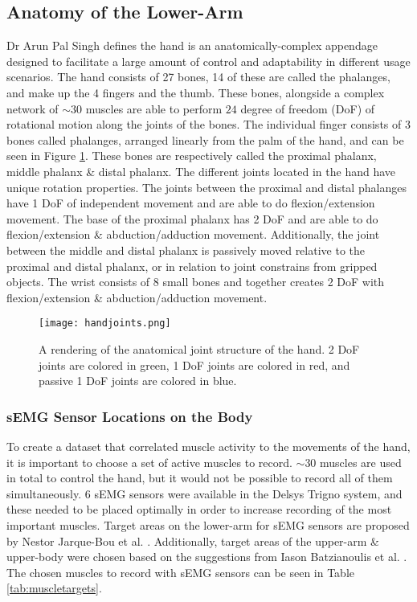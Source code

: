 \documentclass[../main.tex]{subfiles}
\begin{document}
\subsection{Anatomy of the Lower-Arm}
\label{sec:anatomy}

Dr Arun Pal Singh \cite{anatomy} defines the hand is an anatomically-complex appendage designed to facilitate a large amount of control and adaptability in different usage scenarios.
The hand consists of 27 bones, 14 of these are called the \gls{phalanges}, and make up the 4 fingers and the thumb.
These bones, alongside a complex network of $\sim30$ muscles are able to perform $24$ degree of freedom (DoF) of rotational motion along the joints of the bones.
The individual finger consists of 3 bones called \gls{phalanges}, arranged linearly from the palm of the hand, and can be seen in Figure \ref{fig:anatomy}.
These bones are respectively called the \gls{proximal phalanx}, \gls{middle phalanx} \& \gls{distal phalanx}.
The different joints located in the hand have unique rotation properties.
The joints between the proximal and distal phalanges have 1 DoF of independent movement and are able to do \gls{flexion/extension} movement.
The base of the proximal phalanx has 2 DoF and are able to do \gls{flexion/extension} \& \gls{abduction/adduction} movement.
Additionally, the joint between the middle and distal phalanx is passively moved relative to the proximal and distal phalanx, or in relation to joint constrains from gripped objects.
The wrist consists of 8 small bones and together creates 2 DoF with \gls{flexion/extension} \& \gls{abduction/adduction} movement.

\begin{figure}[H]
\begin{center}
\texttt{[image: handjoints.png]}
\caption{A rendering of the anatomical joint structure of the hand. 2 DoF joints are colored in green, 1 DoF joints are colored in red, and passive 1 DoF joints are colored in blue.}
\label{fig:anatomy}
\end{center}
\end{figure}

\subsubsection{sEMG Sensor Locations on the Body}
\label{sec:muscleplacements}

To create a dataset that correlated muscle activity to the movements of the hand, it is important to choose a set of active muscles to record.
$\sim 30$ muscles are used in total to control the hand, but it would not be possible to record all of them simultaneously.
6 sEMG sensors were available in the Delsys Trigno \cite{trigno} system, and these needed to be placed optimally in order to increase recording of the most important muscles.
Target areas on the lower-arm for sEMG sensors are proposed by Nestor Jarque-Bou et al. \cite{jarque2019}.
Additionally, target areas of the upper-arm \& upper-body were chosen based on the suggestions from Iason Batzianoulis et al. \cite{Batzianoulis2018}.
The chosen muscles to record with sEMG sensors can be seen in Table \ref{tab:muscletargets}.
\end{document}
